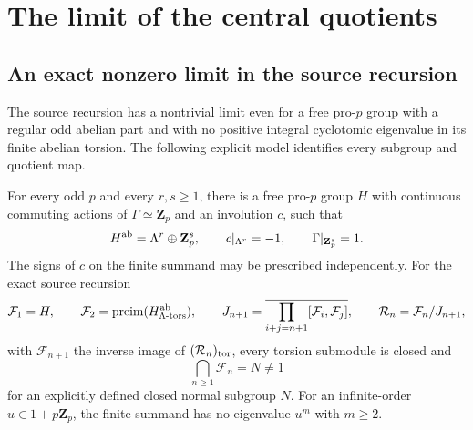 \section{The limit of the central quotients}
\label{sec:source-limit}

\subsection{An exact nonzero limit in the source recursion}
\label{subsec:limit-countermodel}

The source recursion has a nontrivial limit even for
a free pro-$p$ group with a regular odd abelian part
and with no positive integral cyclotomic eigenvalue
in its finite abelian torsion. The following explicit
model identifies every subgroup and quotient map.

\begin{proposition}\label{prop:source-limit-countermodel}
For every odd $p$ and every $r,s\geq1$, there is a
free pro-$p$ group $H$ with continuous commuting
actions of $\Gamma\simeq\mathbf Z_p$ and an involution
$c$, such that
\[
 H^{\rm ab}=\Lambda^r\oplus\mathbf Z_p^s,
 \qquad c|_{\Lambda^r}=-1,
 \qquad\Gamma|_{\mathbf Z_p^s}=1.
\]
The signs of $c$ on the finite summand may be prescribed
independently. For the exact source recursion
\[
 \mathcal F_1=H,\qquad \mathcal F_2=\operatorname{preim}(H^{\rm ab}_{\Lambda\text{-tors}}),
 \qquad J_{n+1}=
 \overline{\prod_{i+j=n+1}[\mathcal F_i,\mathcal F_j]},
 \qquad \mathcal R_n=\mathcal F_n/J_{n+1},
\]
with $\mathcal F_{n+1}$ the inverse image of $(\mathcal R_n)_{\rm tor}$,
every torsion submodule is closed and
\[
                          \bigcap_{n\geq1}\mathcal F_n=N\ne1
\]
for an explicitly defined closed normal subgroup $N$.
For an infinite-order $u\in1+p\mathbf Z_p$, the finite
summand has no eigenvalue $u^m$ with $m\geq2$.
\end{proposition}

